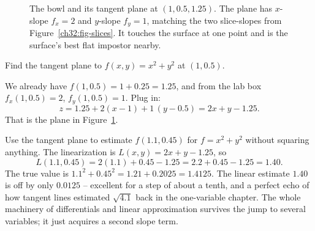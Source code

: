\begin{figure}[H]
\centering
{}
\caption{The bowl and its tangent plane at $(1,0.5,1.25)$. The plane has $x$-slope
$f_x=2$ and $y$-slope $f_y=1$, matching the two slice-slopes from
Figure~\ref{ch32:fig-slices}. It touches the surface at one point and is the surface's best
flat impostor nearby.}
\label{ch32:fig-tangentplane}
\end{figure}

\begin{example}
\label{ch32:ex-tangent}
Find the tangent plane to $f(x,y)=x^2+y^2$ at $(1,0.5)$.

We already have $f(1,0.5)=1+0.25=1.25$, and from the lab box $f_x(1,0.5)=2$,
$f_y(1,0.5)=1$. Plug in:
\[
   z = 1.25 + 2(x-1) + 1\,(y-0.5) = 2x + y - 1.25 .
\]
That is the plane in Figure~\ref{ch32:fig-tangentplane}.
\end{example}

\begin{example}
\label{ch32:ex-linapprox}
Use the tangent plane to estimate $f(1.1, 0.45)$ for $f=x^2+y^2$ without squaring anything.
The linearization is $L(x,y)=2x+y-1.25$, so
\[
   L(1.1,0.45) = 2(1.1) + 0.45 - 1.25 = 2.2 + 0.45 - 1.25 = 1.40 .
\]
The true value is $1.1^2 + 0.45^2 = 1.21 + 0.2025 = 1.4125$. The linear estimate $1.40$ is off
by only $0.0125$ -- excellent for a step of about a tenth, and a perfect echo of how tangent
lines estimated $\sqrt{4.1}$ back in the one-variable chapter. The whole machinery of
differentials and linear approximation survives the jump to several variables; it just acquires
a second slope term.
\end{example}

